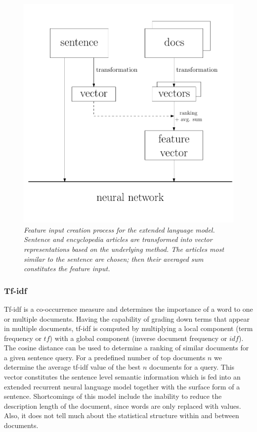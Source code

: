 \documentclass[a4paper]{article}
\begin{document}
\begin{figure} 
\centering 
\includegraphics[width=\columnwidth]{flow.pdf}
\caption{\it Feature input creation process for the extended language model. Sentence and encyclopedia articles are transformed into vector representations based on the underlying method. The articles most similar to the sentence are chosen; then their averaged sum constitutes the feature input.}
\label{fig:flow}
\end{figure}

\subsubsection{Tf-idf}
Tf-idf \cite{salton1986introduction} is a co-occurrence measure and determines the importance of a word to one or multiple documents. Having the capability of grading down terms that appear in multiple documents, tf-idf is computed by multiplying a local component (term frequency or $tf$) with a global component (inverse document frequency or $idf$).
The cosine distance can be used to determine a ranking of similar documents for a given sentence query.
For a predefined number of top documents $n$ we determine the average tf-idf value of the best $n$ documents for a query.
This vector constitutes the sentence level semantic information which is fed into an extended recurrent neural language model together with the surface form of a sentence.
Shortcomings of this model include the inability to reduce the description length of the document, since words are only replaced with values. Also, it does not tell much about the statistical structure within and between documents.
\end{document}

